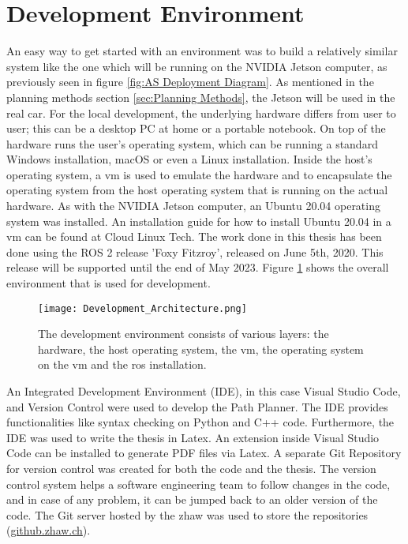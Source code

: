 \section{Development Environment} \label{sec:Development Environment}
An easy way to get started with an environment was to build a relatively similar system like the one which will be running on the NVIDIA Jetson computer, as previously seen in figure \ref{fig:AS Deployment Diagram}. As mentioned in the planning methods section \ref{sec:Planning Methods}, the Jetson will be used in the real car.
For the local development, the underlying hardware differs from user to user; this can be a desktop PC at home or a portable notebook. On top of the hardware runs the user's operating system, which can be running a standard Windows installation, macOS or even a Linux installation. Inside the host's operating system, a \acrlong{vm} is used to emulate the hardware and to encapsulate the operating system from the host operating system that is running on the actual hardware. As with the NVIDIA Jetson computer, an Ubuntu 20.04 operating system was installed. An installation guide for how to install Ubuntu 20.04 in a \acrshort{vm} can be found at Cloud Linux Tech. \cite{cloudlinuxtech_install_ubuntu_2004} The work done in this thesis has been done using the ROS 2 release 'Foxy Fitzroy', released on June 5th, 2020. This release will be supported until the end of May 2023. \cite{ros2_releases_and_target_platforms}
Figure \ref{fig:Development Environment} shows the overall environment that is used for development.
\begin{figure}[H]
    \centering
    \texttt{[image: Development\_Architecture.png]}
    \caption{The development environment consists of various layers: the hardware, the host operating system, the \acrshort{vm}, the operating system on the \acrshort{vm} and the \acrshort{ros} installation.}
    \label{fig:Development Environment}
\end{figure}

An Integrated Development Environment (IDE), in this case Visual Studio Code, and Version Control were used to develop the Path Planner. The IDE provides functionalities like syntax checking on Python and C++ code. Furthermore, the IDE was used to write the thesis in Latex. An extension inside Visual Studio Code can be installed to generate PDF files via Latex. A separate Git Repository for version control was created for both the code and the thesis. The version control system helps a software engineering team to follow changes in the code, and in case of any problem, it can be jumped back to an older version of the code. The Git server hosted by the \acrshort{zhaw} was used to store the repositories (\href{https://github.zhaw.ch}{github.zhaw.ch}).

